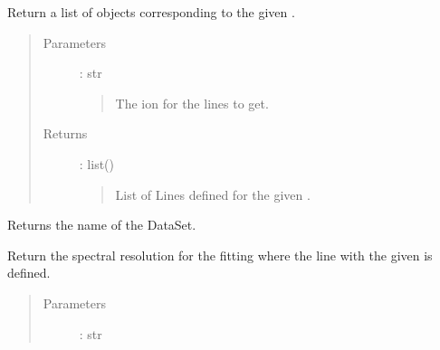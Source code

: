 \documentclass[letterpaper,10pt,english]{sphinxmanual}
\begin{document}
\begin{fulllineitems}

\begin{fulllineitems}
\label{\detokenize{api:VoigtFit.DataSet.get_lines_for_ion}}
Return a list of {\hyperref[\detokenize{api:dataset.Line}]{}} objects
corresponding to the given .
\begin{quote}\begin{description}
\item[{Parameters}] \leavevmode
{} : str
\begin{quote}

The ion for the lines to get.
\end{quote}

\item[{Returns}] \leavevmode
{} : list({\hyperref[\detokenize{api:dataset.Line}]{}})
\begin{quote}

List of Lines defined for the given .
\end{quote}

\end{description}\end{quote}

\end{fulllineitems}


\begin{fulllineitems}
\label{\detokenize{api:VoigtFit.DataSet.get_name}}
Returns the name of the DataSet.

\end{fulllineitems}


\begin{fulllineitems}
\label{\detokenize{api:VoigtFit.DataSet.get_resolution}}
Return the spectral resolution for the fitting {\hyperref[\detokenize{api:regions.Region}]{}}
where the line with the given  is defined.
\begin{quote}\begin{description}
\item[{Parameters}] \leavevmode
{} : str
\begin{quote}


\end{quote}
\end{description}
\end{quote}
\end{fulllineitems}
\end{fulllineitems}
\end{document}
